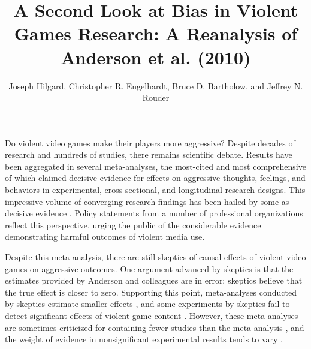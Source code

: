 \documentclass[man]{apa6}
\author{Joseph Hilgard, Christopher R. Engelhardt, Bruce D. Bartholow, and Jeffrey N. Rouder}
\title{A Second Look at Bias in Violent Games Research: A Reanalysis of Anderson et al. (2010)}
\affiliation{University of Missouri}
\begin{document}
\maketitle

Do violent video games make their players more aggressive? Despite decades of research and hundreds of studies, there remains scientific debate. Results have been aggregated in several meta-analyses, the most-cited and most comprehensive of which \citep{Anderson:etal:2010} claimed decisive evidence for effects on aggressive thoughts, feelings, and behaviors in experimental, cross-sectional, and longitudinal research designs. 
This impressive volume of converging research findings has been hailed by some as decisive evidence \citep{Bushman:etal:2010,Huesmann:2010,Huesmann:2014}. 
Policy statements from a number of professional organizations \citep[e.g.,][]{AAP:2009} reflect this perspective, urging the public of the considerable evidence demonstrating harmful outcomes of violent media use.


Despite this meta-analysis, there are still skeptics of causal effects of violent video games on aggressive outcomes.
One argument advanced by skeptics is that the estimates provided by Anderson and colleagues are in error; skeptics believe that the true effect is closer to zero. Supporting this point, meta-analyses conducted by skeptics estimate smaller effects \citep{Ferguson:2007a,Ferguson:2007b,Ferguson:InPress,Sherry:2001}, %
and some experiments by skeptics fail to detect significant effects of violent game content \citep{Adachi:Willoughby:2011,Elson:etal:2013,Ferguson:etal:2008,Valadez:Ferguson:2012}. However, these meta-analyses are sometimes criticized for containing fewer studies than the \citet{Anderson:etal:2010} meta-analysis \citep[][see, e.g., a response by ]{Bushman:XXXX}, and the weight of evidence in nonsignificant experimental results tends to vary \citep{Hilgard:etal:2015}.
\end{document}
